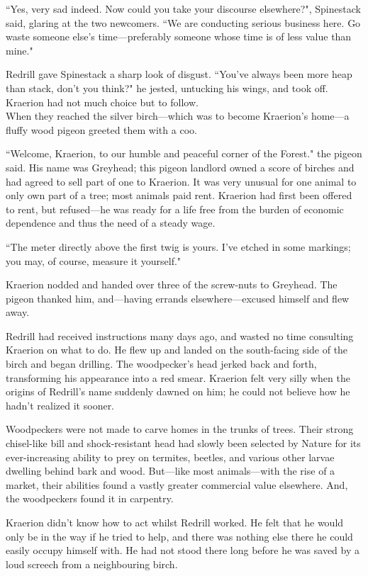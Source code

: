 ``Yes, very sad indeed.
Now could you take your discourse elsewhere?", Spinestack said, glaring at the two newcomers.
``We are conducting serious business here.
Go waste someone else's time---preferably someone whose time is of less value than mine."

Redrill gave Spinestack a sharp look of disgust.
``You've always been more heap than stack, don't you think?" he jested, untucking his wings, and took off.
Kraerion had not much choice but to follow.\\

When they reached the silver birch---which was to become Kraerion's home---a fluffy wood pigeon greeted them with a coo.

``Welcome, Kraerion, to our humble and peaceful corner of the Forest." the pigeon said.
His name was Greyhead; this pigeon landlord owned a score of birches and had agreed to sell part of one to Kraerion.
It was very unusual for one animal to only own part of a tree; most animals paid rent.
Kraerion had first been offered to rent, but refused---he was ready for a life free from the burden of economic dependence and thus the need of a steady wage.

``The meter directly above the first twig is yours.
I've etched in some markings; you may, of course, measure it yourself."

Kraerion nodded and handed over three of the screw-nuts to Greyhead.
The pigeon thanked him, and---having errands elsewhere---excused himself and flew away.

Redrill had received instructions many days ago, and wasted no time consulting Kraerion on what to do.
He flew up and landed on the south-facing side of the birch and began drilling.
The woodpecker's head jerked back and forth, transforming his appearance into a red smear.
Kraerion felt very silly when the origins of Redrill's name suddenly dawned on him; he could not believe how he hadn't realized it sooner.

Woodpeckers were not made to carve homes in the trunks of trees.
Their strong chisel-like bill and shock-resistant head had slowly been selected by Nature for its ever-increasing ability to prey on termites, beetles, and various other larvae dwelling behind bark and wood.
But---like most animals---with the rise of a market, their abilities found a vastly greater commercial value elsewhere.
And, the woodpeckers found it in carpentry.

Kraerion didn't know how to act whilst Redrill worked.
He felt that he would only be in the way if he tried to help, and there was nothing else there he could easily occupy himself with.
He had not stood there long before he was saved by a loud screech from a neighbouring birch.

